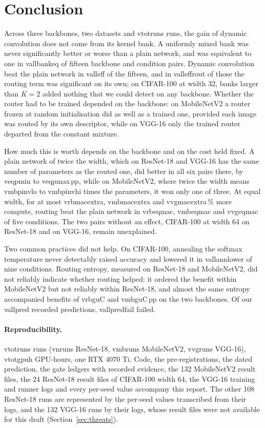 \documentclass[10pt,a4paper]{article}
\newcommand{\V}[1]{\csname v#1\endcsname}
\begin{document}
\section{Conclusion}

Across three backbones, two datasets and \V{totruns} runs, the gain of
dynamic convolution does not come from its kernel bank. A uniformly mixed
bank was never significantly better or worse than a plain network, and was
equivalent to one in \V{allbankeq} of fifteen backbone and condition pairs.
Dynamic convolution beat the plain network in \V{alleff} of the fifteen,
and in \V{alleffrout} of those the routing term was significant on its
own; on CIFAR-100 at width 32, banks larger than $K=2$ added nothing that
we could detect on any backbone. Whether the router had to be trained
depended on the backbone: on MobileNetV2 a router frozen at random
initialisation did as well as a trained one, provided each image was
routed by its own descriptor, while on VGG-16 only the trained router
departed from the constant mixture.

How much this is worth depends on the backbone and on the cost held
fixed. A plain network of twice the width, which on ResNet-18 and VGG-16
has the same number of parameters as the routed one, did better in all six
pairs there, by \V{eqpmin} to \V{eqpmax}\,pp, while on MobileNetV2, where
twice the width means \V{mbpinvlo} to \V{mbpinvhi} times the parameters, it
won only one of three. At equal width, for at most \V{rbmacextra},
\V{mbmacextra} and \V{vgmacextra}\,\% more compute, routing beat the plain
network in \V{rbeqmac}, \V{mbeqmac} and \V{vgeqmac} of five conditions. The
two pairs without an effect, CIFAR-100 at width 64 on ResNet-18 and on
VGG-16, remain unexplained.

Two common practices did not help. On CIFAR-100, annealing the softmax
temperature never detectably raised accuracy and lowered it in
\V{allannlower} of nine conditions. Routing entropy, measured on ResNet-18
and MobileNetV2, did not reliably indicate whether routing helped: it
ordered the benefit within MobileNetV2 but not reliably within ResNet-18,
and almost the same entropy accompanied benefits of \V{rbguC} and
\V{mbguC}\,pp on the two backbones. Of our \V{allpred} recorded
predictions, \V{allpredfail} failed.

\paragraph{Reproducibility.} \V{totruns} runs (\V{nruns} ResNet-18,
\V{mbruns} MobileNetV2, \V{vgruns} VGG-16), \V{totgpuh} GPU-hours, one
RTX 4070 Ti. Code, the pre-registrations, the dated prediction, the gate
ledgers with recorded evidence, the 132 MobileNetV2 result files, the 24
ResNet-18 result files of CIFAR-100 width 64, the VGG-16 training and
runner logs and every per-seed value accompany this report. The other 108
ResNet-18 runs are represented by the per-seed values transcribed from
their logs, and the 132 VGG-16 runs by their logs, whose result files were
not available for this draft (Section~\ref{sec:threats}).
\end{document}
